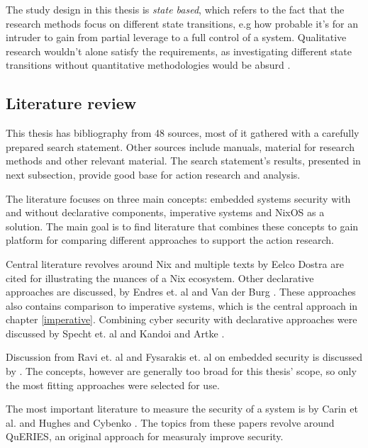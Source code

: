 The study design in this thesis is \textit{state based}, which refers
to the fact that the research methods focus on different state
transitions, e.g how probable it's for an intruder to gain from
partial leverage to a full control of a system. Qualitative research
wouldn't alone satisfy the requirements, as investigating different
state transitions without quantitative methodologies would be absurd
\cite{ramos2017model}.

\subsection{Literature review}\label{litrev}

This thesis has bibliography from 48 sources, most of it gathered with
a carefully prepared search statement. Other sources include manuals,
material for research methods and other relevant material. The search
statement's results, presented in next subsection, provide good base
for action research and analysis.

The literature focuses on three main concepts: embedded systems
security with and without declarative components, imperative systems
and NixOS as a solution. The main goal is to find literature that
combines these concepts to gain platform for comparing different
approaches to support the action research.

Central literature revolves around Nix and multiple texts by Eelco
Dostra are cited for illustrating the nuances of a Nix
ecosystem. Other declarative approaches are discussed, by Endres
et. al and Van der Burg \cite{van2010declarative,
  endres2017declarative}. These approaches also contains comparison to
imperative systems, which is the central approach in chapter
\ref{imperative}. Combining cyber security with declarative approaches
were discussed by Specht et. al and Kandoi and Artke
\cite{specht2007analysis, kandoi2021operating}.

Discussion from Ravi et. al and Fysarakis et. al on embedded security
is discussed by \cite{ravi2004security, fysarakis2014embedded}. The
concepts, however are generally too broad for this thesis' scope, so
only the most fitting approaches were selected for use.

The most important literature to measure the security of a system is
by Carin et al. and Hughes and Cybenko \cite{carin2008cybersecurity,
  hughes2013quantitative}. The topics from these papers revolve around
QuERIES, an original approach for measuraly improve security. 

